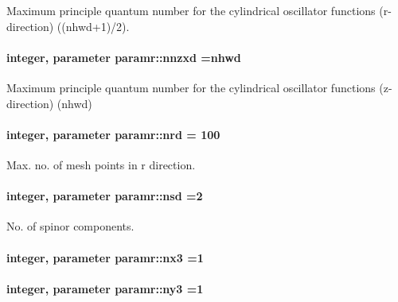 Maximum principle quantum number for the cylindrical oscillator functions (r-\/direction) ((nhwd+1)/2). 

\paragraph[{\texorpdfstring{nnzxd}{nnzxd}}]{\setlength{\rightskip}{0pt plus 5cm}integer, parameter paramr\+::nnzxd ={\bf nhwd}}\hypertarget{namespaceparamr_a2d912f07f6699ff298fd9887808a79fb}{}\label{namespaceparamr_a2d912f07f6699ff298fd9887808a79fb}


Maximum principle quantum number for the cylindrical oscillator functions (z-\/direction) (nhwd) 

\paragraph[{\texorpdfstring{nrd}{nrd}}]{\setlength{\rightskip}{0pt plus 5cm}integer, parameter paramr\+::nrd = 100}\hypertarget{namespaceparamr_a61e145b7c61984697a9be78aa8905d94}{}\label{namespaceparamr_a61e145b7c61984697a9be78aa8905d94}


Max. no. of mesh points in r direction. 

\paragraph[{\texorpdfstring{nsd}{nsd}}]{\setlength{\rightskip}{0pt plus 5cm}integer, parameter paramr\+::nsd =2}\hypertarget{namespaceparamr_a4ff6f5c4777134383ea2daf9fa8709ff}{}\label{namespaceparamr_a4ff6f5c4777134383ea2daf9fa8709ff}


No. of spinor components. 

\paragraph[{\texorpdfstring{nx3}{nx3}}]{\setlength{\rightskip}{0pt plus 5cm}integer, parameter paramr\+::nx3 =1}\hypertarget{namespaceparamr_a1f6d5f50edd0cdf8afaf6ea7e87db420}{}\label{namespaceparamr_a1f6d5f50edd0cdf8afaf6ea7e87db420}
\paragraph[{\texorpdfstring{ny3}{ny3}}]{\setlength{\rightskip}{0pt plus 5cm}integer, parameter paramr\+::ny3 =1}\hypertarget{namespaceparamr_a245f99c088c6d567bfea27dcd9217928}{}\label{namespaceparamr_a245f99c088c6d567bfea27dcd9217928}
